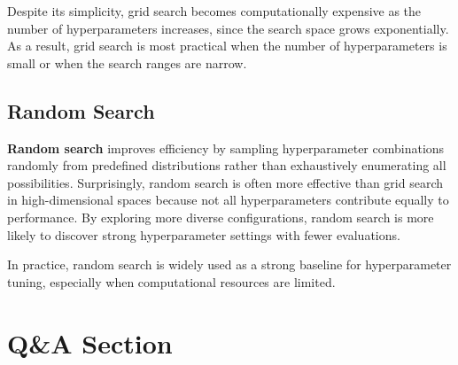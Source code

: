 \documentclass{article}
\begin{document}
Despite its simplicity, grid search becomes computationally expensive as the number of hyperparameters increases, since the search space grows exponentially. As a result, grid search is most practical when the number of hyperparameters is small or when the search ranges are narrow.

\subsection{Random Search}

\textbf{Random search} improves efficiency by sampling hyperparameter combinations randomly from predefined distributions rather than exhaustively enumerating all possibilities. Surprisingly, random search is often more effective than grid search in high-dimensional spaces because not all hyperparameters contribute equally to performance. By exploring more diverse configurations, random search is more likely to discover strong hyperparameter settings with fewer evaluations.

In practice, random search is widely used as a strong baseline for hyperparameter tuning, especially when computational resources are limited.
\section{Q\&A Section}
\end{document}

